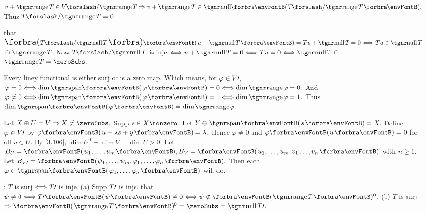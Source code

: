 $v+\range T\in V\XSlash \range T\Rightarrow v+\range T\in\Null\Par{T\XSlash{\range T}}.$ Thus $T\XSlash{\range T}=0.$\PfEnd
\SepLine

\NOTICE that $\BigPar{T\XSlash{\null T}}\Par{u+\null T}=Tu+\null T=0\Longleftrightarrow Tu\in{\null T}${\Large${}\cap{}$}${\range T}.$\parSol{}
Now $T\XSlash{\null T}$ is inje $\Longleftrightarrow u+\null T=0\Longleftrightarrow Tu=0 \Longleftrightarrow{\null T}${\Large${}\cap{}$}${\range T}=\zeroSubs.$\PfEnd
\SepLine
\ChEnd

\pagebreak
{}

\vspace{4pt}

\BulletPointX{}\;\;Every liney functional is either surj or is a zero map.\TextB{}
Which means, for $\varphi\in V\prime,$ $\varphi=0\Longleftrightarrow\dim\Span{\varphi}=0\Longleftrightarrow\dim\range\varphi=0.$\TextB{}
And $\varphi\neq 0\Longleftrightarrow\dim\Span{\varphi}=1\Longleftrightarrow\dim\range\varphi=1.$ Thus $\dim\Span{\varphi}=\dim\range\varphi.$
\SepLine

Let $X\oplus U=V\Rightarrow X\neq\zeroSubs.$ Supp $s\in X\nonzero.$ Let $Y\oplus\Span{s}=X.$\parSol{}
Define $\varphi\in V\prime$ by $\varphi\Par{u+\lambda s+y}=\lambda.$ Hence $\varphi\neq 0$ and $\varphi\Par{u}=0$ for all $u\in U.$\PfEnd\parSol{\vspace{4pt}}
\Or {} \;By [3.106], $\dim U^0=\dim V-\dim U>0.$\parSol{}
\Blind{\Or }\Or Let $B_U=\Par{u_1,\dots,u_m},B_V=\Par{u_1,\dots,u_m,v_1\dots,v_n}$ with $n\geqslant 1.$\parSol{}
\Blind{\Or}Let $B_{V\apostrophe}=\Par{\psi_1,\dots,\psi_m,\varphi_1,\dots,\varphi_n}.$ Then each $\varphi\in\Span{\varphi_1,\dots,\varphi_n}$ will do.\PfEnd\vspace{4pt}
\ACoro {}\par
{}: $T$ is surj $\Longleftrightarrow T\prime$ is inje.\parCom
(a) Supp $T\prime$ is inje. \NOTICE that $\psi\neq 0\Longleftrightarrow T\apostrophe\Par{\psi}\neq 0\Longleftrightarrow\psi\not\in\Par{\range T}{^0}.$\parCom
(b) $T$ is surj $\Rightarrow\Par{\range T}{^0}=\zeroSubs=\null T\apostrophe.$\PfEnd
\SepLine

